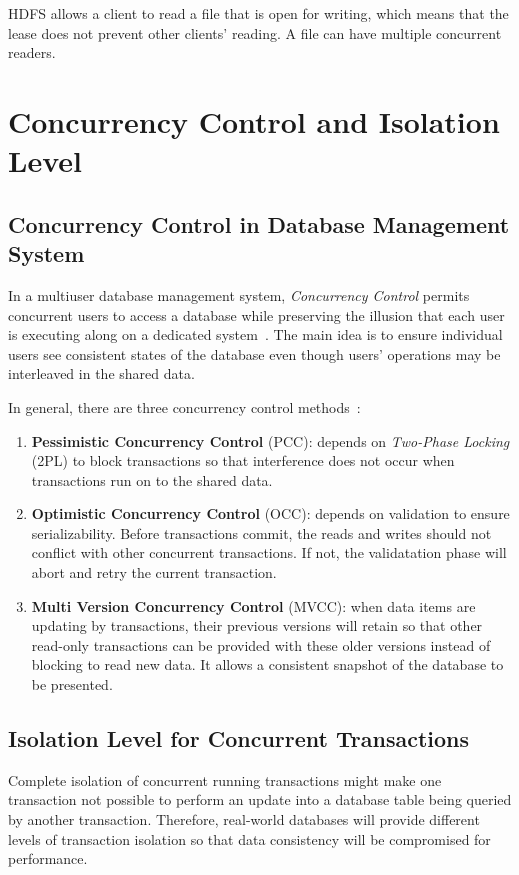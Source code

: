 \noindent HDFS allows a client to read a file that is open for writing, which means that the lease does not prevent other clients' reading. A file can have multiple concurrent readers.

\section{Concurrency Control and Isolation Level}

\subsection{Concurrency Control in Database Management System}
In a multiuser database management system, \textit{Concurrency Control} permits concurrent users to access a database while preserving the illusion that each user is executing along on a dedicated system~\cite{bernstein1981concurrency}. The main idea is to ensure individual users see consistent states of the database even though users' operations may be interleaved in the shared data.

\noindent In general, there are three concurrency control methods~\cite{franklin1997concurrency}:
\begin{enumerate}[noitemsep]
	\item \textbf{Pessimistic Concurrency Control} (PCC): depends on \textit{Two-Phase Locking} (2PL) to block transactions so that interference does not occur when transactions run on to the shared data.
	\item \textbf{Optimistic Concurrency Control} (OCC): depends on validation to ensure serializability. Before transactions commit, the reads and writes should not conflict with other concurrent transactions. If not, the validatation phase will abort and retry the current transaction.
	\item \textbf{Multi Version Concurrency Control} (MVCC): when data items are updating by transactions, their previous versions will retain so that other read-only transactions can be provided with these older versions instead of blocking to read new data. It allows a consistent snapshot of the database to be presented.
\end{enumerate}

\subsection{Isolation Level for Concurrent Transactions}

\noindent Complete isolation of concurrent running transactions might make one transaction not possible to perform an update into a database table being queried by another transaction. Therefore, real-world databases will provide different levels of transaction isolation so that data consistency will be compromised for performance.

